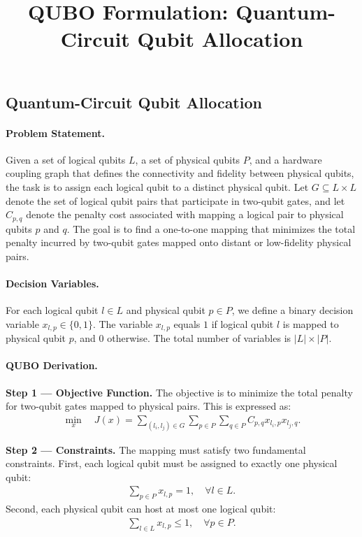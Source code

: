 \documentclass[12pt]{article}
\title{QUBO Formulation: Quantum-Circuit Qubit Allocation}
\date{}
\begin{document}
\maketitle

\subsection*{Quantum-Circuit Qubit Allocation}

\paragraph{Problem Statement.}
Given a set of logical qubits $L$, a set of physical qubits $P$, and a hardware coupling graph that defines the connectivity and fidelity between physical qubits, the task is to assign each logical qubit to a distinct physical qubit. Let $G \subseteq L \times L$ denote the set of logical qubit pairs that participate in two-qubit gates, and let $C_{p,q}$ denote the penalty cost associated with mapping a logical pair to physical qubits $p$ and $q$. The goal is to find a one-to-one mapping that minimizes the total penalty incurred by two-qubit gates mapped onto distant or low-fidelity physical pairs.

\paragraph{Decision Variables.}
For each logical qubit $l \in L$ and physical qubit $p \in P$, we define a binary decision variable $x_{l,p} \in \{0,1\}$. The variable $x_{l,p}$ equals $1$ if logical qubit $l$ is mapped to physical qubit $p$, and $0$ otherwise. The total number of variables is $|L| \times |P|$.

\paragraph{QUBO Derivation.}
\textbf{Step 1 --- Objective Function.}
The objective is to minimize the total penalty for two-qubit gates mapped to physical pairs. This is expressed as:
\begin{align}
\min_{x} \quad J(x) = \sum_{(l_i, l_j) \in G} \sum_{p \in P} \sum_{q \in P} C_{p,q} x_{l_i,p} x_{l_j,q}.
\end{align}

\textbf{Step 2 --- Constraints.}
The mapping must satisfy two fundamental constraints. First, each logical qubit must be assigned to exactly one physical qubit:
\begin{align}
\sum_{p \in P} x_{l,p} = 1, \quad \forall l \in L.
\end{align}
Second, each physical qubit can host at most one logical qubit:
\begin{align}
\sum_{l \in L} x_{l,p} \le 1, \quad \forall p \in P.
\end{align}
\end{document}
